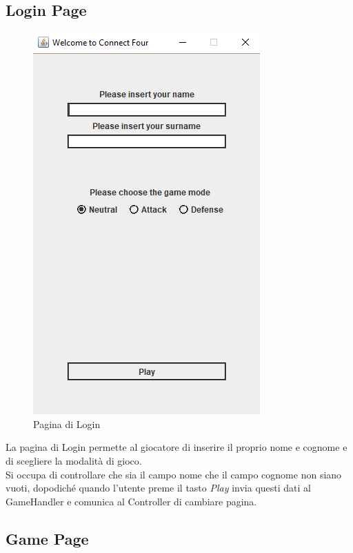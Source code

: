 \subsection{Login Page}\label{subsec:login-page}

\begin{figure}
    \centering
    \includegraphics[scale=0.5]{img/login-page}
    \caption{Pagina di Login}
    \label{fig:login-page}
\end{figure}

La pagina di Login permette al giocatore di inserire il proprio nome e cognome e di scegliere la modalità di gioco. \\
Si occupa di controllare che sia il campo nome che il campo cognome non siano vuoti, dopodiché quando l'utente preme
il tasto \textit{Play} invia questi dati al GameHandler e comunica al Controller di cambiare pagina. \\


\newpage
\subsection{Game Page}\label{subsec:game-page}


